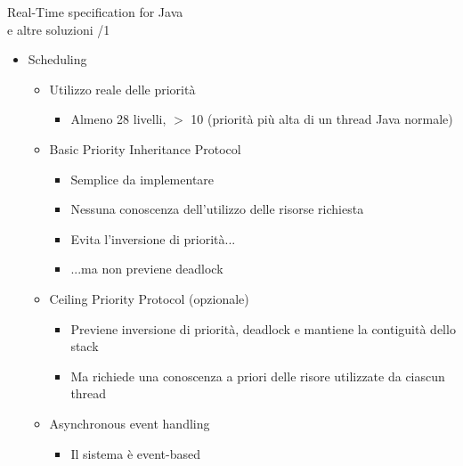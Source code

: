 \begin{frame}{Real-Time specification for Java \\e altre soluzioni /1}
	\begin{itemize}
		\item Scheduling
		\begin{itemize}
			\item Utilizzo reale delle priorità
			\begin{itemize}
				\item Almeno 28 livelli, $>$ 10 (priorità più alta di un thread Java normale)
			\end{itemize}
			\item Basic Priority Inheritance Protocol
			\begin{itemize}
				\item Semplice da implementare
				\item Nessuna conoscenza dell'utilizzo delle risorse richiesta
				\item Evita l'inversione di priorità...
				\item ...ma non previene deadlock
			\end{itemize}
			\item Ceiling Priority Protocol (opzionale)
			\begin{itemize}
				\item Previene inversione di priorità, deadlock e mantiene la contiguità dello stack
				\item Ma richiede una conoscenza a priori delle risore utilizzate da ciascun thread
			\end{itemize}
			\item Asynchronous event handling
			\begin{itemize}
				\item Il sistema è event-based
			\end{itemize}
		\end{itemize}
	\end{itemize}
\end{frame}
